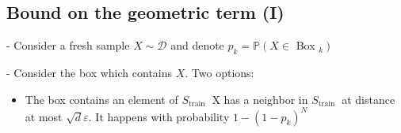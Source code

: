 
\subsection*{Bound on the geometric term (I)}
- Consider a fresh sample $X \sim \mathscr{D}$ and denote $p_{k}=\mathbb{P}\left(X \in\right.$ Box $\left._{k}\right)$



- Consider the box which contains $X$. Two options:


\begin{itemize}
  \item The box contains an element of $S_{\text {train }}$ X has a neighbor in $S_{\text {train }}$ at distance at most $\sqrt{d} \varepsilon$. It happens with probability $1-\left(1-p_{k}\right)^{N}$
\end{itemize}




